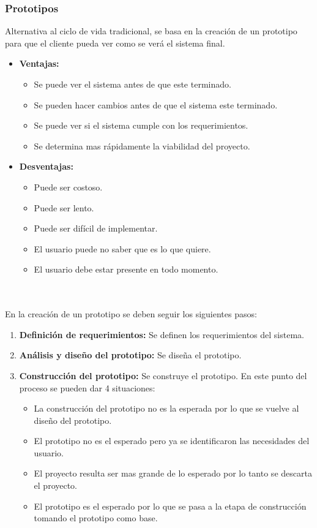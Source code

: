 \documentclass{templateNote}
\begin{document}
\subsubsection{Prototipos}
\noindent Alternativa al ciclo de vida tradicional, se basa en la creación de un prototipo para que el cliente pueda ver como se verá el sistema final.
\begin{itemize}
    \item \textbf{Ventajas:}
    \begin{itemize}
        \item Se puede ver el sistema antes de que este terminado.
        \item Se pueden hacer cambios antes de que el sistema este terminado.
        \item Se puede ver si el sistema cumple con los requerimientos.
        \item Se determina mas rápidamente la viabilidad del proyecto.
    \end{itemize}
    \item \textbf{Desventajas:}
    \begin{itemize}
        \item Puede ser costoso.
        \item Puede ser lento.
        \item Puede ser difícil de implementar.
        \item El usuario puede no saber que es lo que quiere.
        \item El usuario debe estar presente en todo momento.\\\\\\
    \end{itemize}
\end{itemize}
\noindent En la creación de un prototipo se deben seguir los siguientes pasos:
\begin{enumerate}
    \item \textbf{Definición de requerimientos:} Se definen los requerimientos del sistema.
    \item \textbf{Análisis y diseño del prototipo:} Se diseña el prototipo.
    \item \textbf{Construcción del prototipo:} Se construye el prototipo.
    En este punto del proceso se pueden dar 4 situaciones:
    \begin{itemize}
        \item La construcción del prototipo no es la esperada por lo que se vuelve al diseño del prototipo.
        \item El prototipo no es el esperado pero ya se identificaron las necesidades del usuario.
        \item El proyecto resulta ser mas grande de lo esperado por lo tanto se descarta el proyecto.
        \item El prototipo es el esperado por lo que se pasa a la etapa de construcción tomando el prototipo como base.
    \end{itemize}
\end{enumerate}
\end{document}
